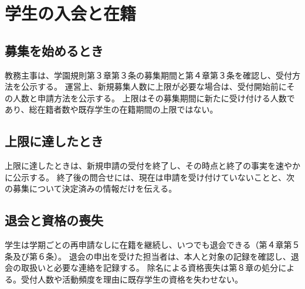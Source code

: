 ﻿\newpage
\chapter{学生の入会と在籍}

\section{募集を始めるとき}

教務主事は、学園規則第３章第３条の募集期間と第４章第３条を確認し、受付方法を公示する。
運営上、新規募集人数に上限が必要な場合は、受付開始前にその人数と申請方法を公示する。
上限はその募集期間に新たに受け付ける人数であり、総在籍者数や既存学生の在籍期間の上限ではない。

\section{上限に達したとき}

上限に達したときは、新規申請の受付を終了し、その時点と終了の事実を速やかに公示する。
終了後の問合せには、現在は申請を受け付けていないことと、次の募集について決定済みの情報だけを伝える。

\section{退会と資格の喪失}

学生は学期ごとの再申請なしに在籍を継続し、いつでも退会できる（第４章第５条及び第６条）。
退会の申出を受けた担当者は、本人と対象の記録を確認し、退会の取扱いと必要な連絡を記録する。
除名による資格喪失は第８章の処分による。受付人数や活動頻度を理由に既存学生の資格を失わせない。
